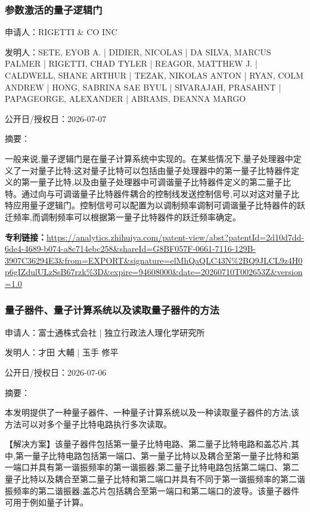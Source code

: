 \documentclass[12pt,a4paper]{ctexart}
\begin{document}
\subsubsection{ 参数激活的量子逻辑门 }

申请人：RIGETTI \& CO INC

发明人：SETE, EYOB A. | DIDIER, NICOLAS | DA SILVA, MARCUS PALMER | RIGETTI, CHAD TYLER | REAGOR, MATTHEW J. | CALDWELL, SHANE ARTHUR | TEZAK, NIKOLAS ANTON | RYAN, COLM ANDREW | HONG, SABRINA SAE BYUL | SIVARAJAH, PRASAHNT | PAPAGEORGE, ALEXANDER | ABRAMS, DEANNA MARGO

公开日/授权日：2026-07-07

摘要：

一般来说,量子逻辑门是在量子计算系统中实现的。在某些情况下,量子处理器中定义了一对量子比特;这对量子比特可以包括由量子处理器中的第一量子比特器件定义的第一量子比特,以及由量子处理器中可调谐量子比特器件定义的第二量子比特。通过向与可调谐量子比特器件耦合的控制线发送控制信号,可以对这对量子比特应用量子逻辑门。控制信号可以配置为以调制频率调制可调谐量子比特器件的跃迁频率,而调制频率可以根据第一量子比特器件的跃迁频率确定。

\noindent\textbf{专利链接：}\url{https://analytics.zhihuiya.com/patent-view/abst?patentId=2d10d7dd-6de4-4689-b074-a8c714ebc258&shareId=G8BF057F-0661-7116-129B-3907C36294E3&from=EXPORT&signature=elMhQaQLC43N%2BQ9JLCL9z4H0p6gIZdulULzSsB67rzk%3D&expire=94608000&date=20260710T002653Z&version=1.0}

\subsubsection{ 量子器件、量子计算系统以及读取量子器件的方法 }

申请人：富士通株式会社 | 独立行政法人理化学研究所

发明人：才田 大輔 | 玉手 修平

公开日/授权日：2026-07-06

摘要：

本发明提供了一种量子器件、一种量子计算系统以及一种读取量子器件的方法,该方法可以对多个量子比特电路执行多次读取。 

 【解决方案】该量子器件包括第一量子比特电路、第二量子比特电路和盖芯片,其中,第一量子比特电路包括第一端口、第一量子比特以及耦合至第一量子比特和第一端口并具有第一谐振频率的第一谐振器;第二量子比特电路包括第二端口、第二量子比特以及耦合至第二量子比特和第二端口并具有不同于第一谐振频率的第二谐振频率的第二谐振器;盖芯片包括耦合至第一端口和第二端口的波导。该量子器件可用于例如量子计算。
\end{document}
